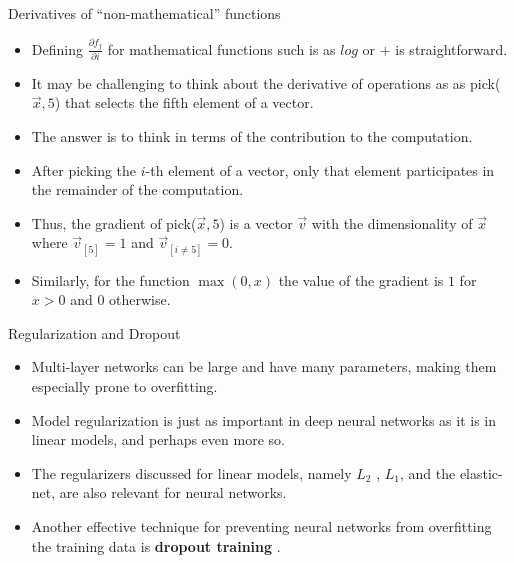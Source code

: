 \documentclass[handout]{beamer}
\begin{document}
\begin{frame}{Derivatives of ``non-mathematical'' functions}
\begin{scriptsize}
\begin{itemize}

\item Defining  $\frac{\partial f_j}{ \partial i}$ for mathematical functions such is as $log$ or $+$ is straightforward.

\item It may be challenging to think about the derivative of operations as as pick($\vec{x},5$) that selects the fifth element of a vector.

\item The answer is to think in terms of the contribution to the computation. 

\item After picking the $i$-th element of a vector, only that element participates in the remainder of the computation. 

\item Thus, the gradient of pick($\vec{x},5$) is a vector $\vec{v}$ with the dimensionality of $\vec{x}$ where $\vec{v}_{[5]} =1$ and $\vec{v}_{[i \neq 5]} = 0$.

\item Similarly, for the function $\max(0,x)$  the value of the gradient is $1$ for $x>0$ and $0$ otherwise.

\end{itemize}
\end{scriptsize}
\end{frame}




\begin{frame}{Regularization and Dropout}
\begin{scriptsize}
\begin{itemize}
\item Multi-layer networks can be large and have many parameters, making them especially prone to overfitting.

\item Model regularization is just as important in deep neural networks as it is in linear models, and perhaps even more so.

\item The regularizers discussed for linear models, namely $L_2$ , $L_1$, and the elastic-net, are also relevant for neural networks.

\item Another effective technique for preventing neural networks from overfitting the training data is \textbf{dropout training} \cite{srivastava2014dropout}.


\end{itemize}
\end{scriptsize}
\end{frame}
\end{document}
